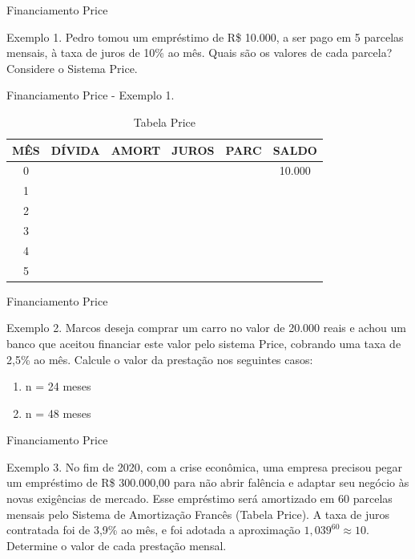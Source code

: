 \documentclass[12pt]{beamer}
\begin{document}
		\begin{frame}{Financiamento Price}
			\begin{exampleblock}{Exemplo 1.}
				\justifying
				Pedro tomou um empréstimo de R\$ 10.000, a ser pago em 5 parcelas mensais, à taxa de juros de 10\% ao mês. Quais são os valores de cada parcela? Considere o Sistema Price.
			\end{exampleblock}
		\end{frame}	
		
		\begin{frame}{Financiamento Price - Exemplo 1.}
		\begin{table}[h]
			\centering
			\begin{tabular}{|c|c|c|c|c|c|}
				\hline
				MÊS & DÍVIDA & AMORT & JUROS & PARC & SALDO \\
				\hline
				0 & & & & & 10.000 \\
				\hline
				1 & & & & & \\
				\hline
				2 & & & & & \\
				\hline
				3 & & & & & \\
				\hline
				4 & & & & & \\
				\hline
				5 & & & & & \\
				\hline
			\end{tabular}
			\caption{Tabela Price}
		\end{table}
		\end{frame}
		
		\begin{frame}{Financiamento Price}
			\begin{exampleblock}{Exemplo 2.}
				\justifying
				Marcos deseja comprar um carro no valor de 20.000 reais e achou um banco que aceitou financiar este valor pelo sistema Price, cobrando uma taxa de 2,5\% ao mês. Calcule o valor da prestação nos seguintes casos:
				
				\begin{enumerate}
					\item [a)] n = 24 meses %
					\item [b)] n = 48 meses %
				\end{enumerate}
			\end{exampleblock}
		\end{frame}	
		
		\begin{frame}{Financiamento Price}
			\begin{exampleblock}{Exemplo 3.}
				\justifying
				No fim de 2020, com a crise econômica, uma empresa precisou pegar um empréstimo de R\$ 300.000,00 para não abrir falência e adaptar seu negócio às novas exigências de mercado. Esse empréstimo será amortizado em 60 parcelas mensais pelo Sistema de Amortização Francês (Tabela Price). A taxa de juros contratada foi de 3,9\% ao mês, e foi adotada a aproximação \(1,039^{60} \approx 10\). Determine o valor de cada prestação mensal.
				
			\end{exampleblock}
		\end{frame}	
		
\end{document}
